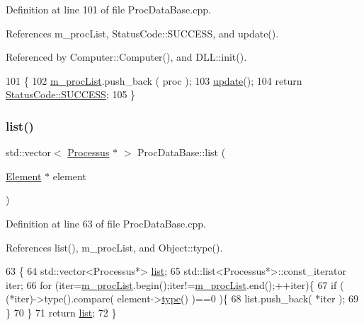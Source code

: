 Definition at line 101 of file Proc\+Data\+Base.\+cpp.



References m\+\_\+proc\+List, Status\+Code\+::\+S\+U\+C\+C\+E\+SS, and update().



Referenced by Computer\+::\+Computer(), and D\+L\+L\+::init().


\begin{DoxyCode}
101                                                \{
102   \hyperlink{classProcDataBase_a9b7458b811b826c5d264b436c7a391c4}{m\_procList}.push\_back ( proc );
103   \hyperlink{classProcDataBase_a604959db08c3871d863a799cc4e1d5f4}{update}();
104   \textcolor{keywordflow}{return} \hyperlink{classStatusCode_a6f565cbeadc76d14c72f047e5e85eb4badd0da38d3ba0d922efd1f4619bc37ad8}{StatusCode::SUCCESS};
105 \}
\end{DoxyCode}
\mbox{\label{classProcDataBase_a6f17bfad64929fa887c6aafb0080354b}} 
\subsubsection{\texorpdfstring{list()}{list()}\hspace{0.1cm}{\footnotesize\ttfamily [1/2]}}
{\footnotesize\ttfamily std\+::vector$<$ \hyperlink{classProcessus}{Processus} $\ast$ $>$ Proc\+Data\+Base\+::list (\begin{DoxyParamCaption}\item[{\hyperlink{classElement}{Element} $\ast$}]{element }\end{DoxyParamCaption})}



Definition at line 63 of file Proc\+Data\+Base.\+cpp.



References list(), m\+\_\+proc\+List, and Object\+::type().


\begin{DoxyCode}
63                                                             \{
64   std::vector<Processus*> \hyperlink{classProcDataBase_a813dbc8f9e7c4d69074a01394f04fc98}{list};
65   std::list<Processus*>::const\_iterator iter;
66   \textcolor{keywordflow}{for} (iter=\hyperlink{classProcDataBase_a9b7458b811b826c5d264b436c7a391c4}{m\_procList}.begin();iter!=\hyperlink{classProcDataBase_a9b7458b811b826c5d264b436c7a391c4}{m\_procList}.end();++iter)\{
67     \textcolor{keywordflow}{if} ( (*iter)->type().compare( element->\hyperlink{classObject_a84f99f70f144a83e1582d1d0f84e4e62}{type}() )==0 )\{
68       list.push\_back( *iter );        
69     \}
70   \}
71   \textcolor{keywordflow}{return} \hyperlink{classProcDataBase_a813dbc8f9e7c4d69074a01394f04fc98}{list};
72 \}
\end{DoxyCode}
\mbox{\label{classProcDataBase_a813dbc8f9e7c4d69074a01394f04fc98}} 
